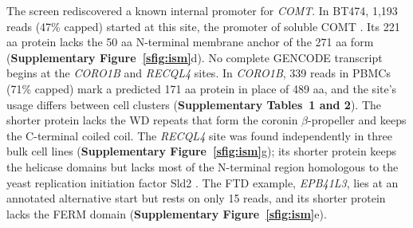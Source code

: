 The screen rediscovered a known internal promoter for \emph{COMT}. In BT474, 1,193 reads (47\% capped) started at this site, the promoter of soluble COMT \citep{tenhunen1994}. Its 221 aa protein lacks the 50 aa N-terminal membrane anchor of the 271 aa form \citep{lundstrom1991} (\textbf{Supplementary Figure~\ref{sfig:ism}}d). No complete GENCODE \citep{mudge2025} transcript begins at the \emph{CORO1B} and \emph{RECQL4} sites. In \emph{CORO1B}, 339 reads in PBMCs (71\% capped) mark a predicted 171 aa protein in place of 489 aa, and the site's usage differs between cell clusters (\textbf{Supplementary Tables~1 and 2}). The shorter protein lacks the WD repeats that form the coronin $\beta$-propeller and keeps the C-terminal coiled coil. The \emph{RECQL4} site was found independently in three bulk cell lines (\textbf{Supplementary Figure~\ref{sfig:ism}}g); its shorter protein keeps the helicase domains but lacks most of the N-terminal region homologous to the yeast replication initiation factor Sld2 \citep{keller2014}. The FTD example, \emph{EPB41L3}, lies at an annotated alternative start but rests on only 15 reads, and its shorter protein lacks the FERM domain (\textbf{Supplementary Figure~\ref{sfig:ism}}e).

